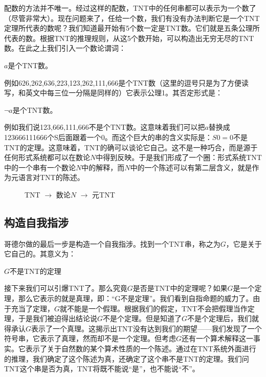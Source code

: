 \documentclass[b5paper]{ctexart}
\begin{document}
配数的方法并不唯一。经过这样的配数，TNT中的任何串都可以表示为一个数了（尽管非常大）。现在问题来了，任给一个数，我们有没有办法判断它是一个TNT定理所代表的数呢？我们知道最开始有5个数一定是TNT数。它们就是五条公理所代表的数。根据TNT的推理规则，从这5个数开始，可以构造出无穷无尽的TNT数。在此之上我们引入一个数论谓词：

\begin{center}
$a$是个TNT数。
\end{center}

例如626,262,636,223,123,262,111,666是个TNT数（这里的逗号只是为了方便读写，和英文中每三位一分隔是同样的）它表示公理1。其否定形式是：

\begin{center}
$\lnot a$是个TNT数。
\end{center}

例如我们说123,666,111,666不是个TNT数。这意味着我们可以把$a$替换成123666111666个S后面跟着一个0。而这个巨大的串的含义实际是：$S0 = 0$不是TNT的定理。这意味着，TNT的确可以谈论它自己。这不是一种巧合，而是源于任何形式系统都可以在数论$N$中得到反映。于是我们形成了一个圈：形式系统TNT中的一个串有一个数论$N$中的解释，而$N$中的一个陈述可以有第二层含义，就是作为元语言对TNT的陈述。

\begin{figure}[htbp]
\centering
{}
\caption{TNT $\to$ 数论$N$ $\to$ 元TNT}
\label{fig:TNT-N-TNT}
\end{figure}

\subsection{构造自我指涉}

哥德尔做的最后一步是构造一个自我指涉。找到一个TNT串，称之为$G$，它是关于它自己的。其意义为：

\begin{center}
$G$不是TNT的定理
\end{center}

接下来我们可以引爆TNT了。那么究竟$G$是否是TNT中的定理呢？如果$G$是一个定理，那么它表示的就是真理，即：“G不是定理”。我们看到自指命题的威力了。由于充当了定理，$G$就不能是一个假理。根据我们的假定，TNT不会把假理当作定理，于是我们被迫得出结论说$G$不是个定理。但是知道了$G$不是个定理后，我们就得承认$G$表示了一个真理。这揭示出TNT没有达到我们的期望——我们发现了一个符号串，它表示了真理，然而却不是一个定理。但考虑$G$还有一个算术解释这一事实。它表示了关于自然数的某个算术性质的一个陈述。通过在TNT系统外面进行的推理，我们确定了这个陈述为真，还确定了这个串不是TNT的定理。我们问TNT这个串是否为真，TNT将既不能说“是”，也不能说“不”。
\end{document}
